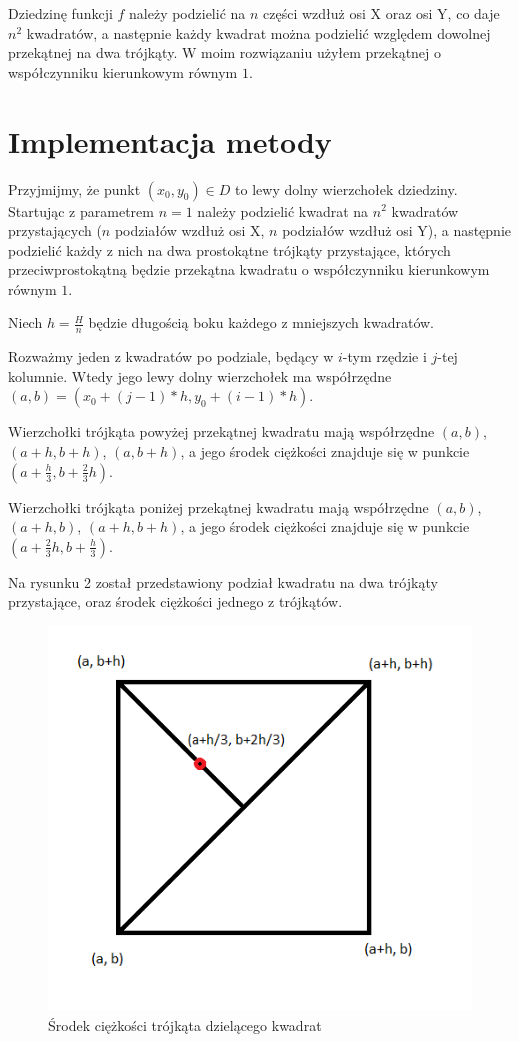 \documentclass[12pt]{article}
\begin{document}
	Dziedzinę funkcji $f$ należy podzielić na $n$ części wzdłuż osi X oraz osi Y, co daje $n^2$ kwadratów, a następnie każdy kwadrat można podzielić względem dowolnej przekątnej na dwa trójkąty. W moim rozwiązaniu użyłem przekątnej o współczynniku kierunkowym równym $1$.
	
	\section{Implementacja metody}
	Przyjmijmy, że punkt $(x_0, y_0) \in D$ to lewy dolny wierzchołek dziedziny. Startując z parametrem $n = 1$ należy podzielić kwadrat na $n^2$ kwadratów przystających ($n$ podziałów wzdłuż osi X, $n$ podziałów wzdłuż osi Y), a następnie podzielić każdy z nich na dwa prostokątne trójkąty przystające, których przeciwprostokątną będzie przekątna kwadratu o współczynniku kierunkowym równym $1$.
	
	Niech $h = \frac{H}{n}$ będzie długością boku każdego z mniejszych kwadratów.
	
	Rozważmy jeden z kwadratów po podziale, będący w $i$-tym rzędzie i $j$-tej kolumnie. Wtedy jego lewy dolny wierzchołek ma współrzędne $(a, b) = (x_0 + (j-1)*h, y_0 + (i-1)*h)$.
	
	Wierzchołki trójkąta powyżej przekątnej kwadratu mają współrzędne $(a, b)$, $(a + h, b + h)$, $(a, b + h)$, a jego środek ciężkości znajduje się w punkcie $(a + \frac{h}{3}, b + \frac{2}{3}h)$.
	
	Wierzchołki trójkąta poniżej przekątnej kwadratu mają współrzędne $(a, b)$, $(a + h, b)$, $(a + h, b + h)$, a jego środek ciężkości znajduje się w punkcie $(a + \frac{2}{3}h, b + \frac{h}{3})$.
	
	Na rysunku 2 został przedstawiony podział kwadratu na dwa trójkąty przystające, oraz środek ciężkości jednego z trójkątów.
	
	\pagebreak
	
	\begin{figure}
		\centering
		\includegraphics[scale=1]{images/single-square-gravity-center.png}
		\caption{Środek ciężkości trójkąta dzielącego kwadrat}
	\end{figure}
	
\end{document}
